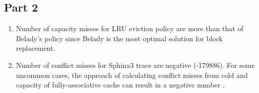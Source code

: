 \subsection{Part 2}
\begin{enumerate}
	\item  Number of capacity misses for LRU eviction policy are more than that of Belady's policy since Belady is the most optimal solution for block replacement.
	\item Number of conflict misses for Sphinx3 trace are negative (-179886). For some uncommon cases, the approach of calculating conflict misses from cold and capacity of fully-associative cache can result in a negative number \cite{solihin2015fundamentals}.
\end{enumerate}